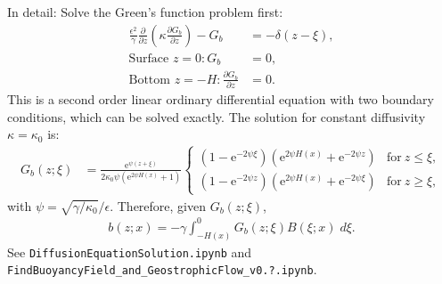 \documentclass[10pt]{amsart}
\begin{document}
In detail: Solve the Green's function problem first:
\begin{align}
\frac{\epsilon^2}{\gamma} \frac{\partial }{\partial z} \left( \kappa \frac{\partial G_b}{\partial z} \right) -  G_b & =  -  \delta(z - \xi) , \label{eqn:Gsfn}\\
\text{Surface~}z = 0:
G_b &= 0 ,
\label{eqn:Gsfn_sfcbc} \\
\text{Bottom~}z = -H:
\frac{\partial G_b}{\partial z} &= 0 .
\label{eqn:Gsfn_botbc}
\end{align}
This is a second order linear ordinary differential equation with two boundary conditions, which can be solved exactly.
The solution for constant diffusivity $\kappa = \kappa_0$ is:
\begin{align}
G_b (z; \xi) & = \frac{\mathrm{e}^{\psi \left(z + \xi\right)}}
{2  \kappa_0 \psi \left(\mathrm{e}^{2 \psi H \left(x \right)} + 1\right)}
\begin{cases} 
\displaystyle \left(1 - \mathrm{e}^{- 2 \psi \xi} \right) \left(\mathrm{e}^{2 \psi H{\left(x \right)}} + \mathrm{e}^{- 2 \psi z  }\right) & \text{for}\: z \leq \xi , \\
\displaystyle \left(1 - \mathrm{e}^{- 2 \psi   z} \right) \left(\mathrm{e}^{2 \psi H{\left(x \right)}} + \mathrm{e}^{- 2 \psi \xi}\right) & \text{for}\: z \geq \xi ,
\end{cases}
\end{align}
with $\psi = \sqrt{\gamma/\kappa_0} / \epsilon$.
Therefore, given $G_b(z; \xi)$,
\begin{align}
b(z; x) = - \gamma \int_{-H(x)}^{0} G_b(z; \xi) B(\xi; x) \; d \xi  .
\end{align}
See \texttt{DiffusionEquationSolution.ipynb} and \texttt{FindBuoyancyField\_and\_GeostrophicFlow\_v0.?.ipynb}.
\end{document}
